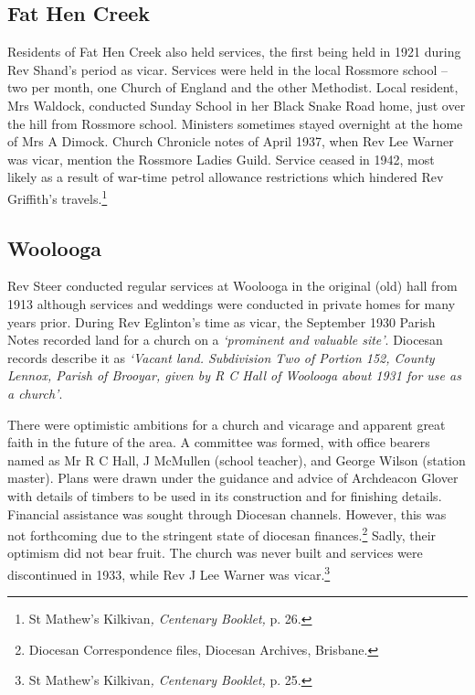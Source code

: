 \subsection{Fat Hen Creek}



Residents of Fat Hen Creek also held services, the first being held in 1921 during Rev Shand's period as vicar. Services were held in the local Rossmore school -- two per month, one Church of England and the other Methodist. Local resident, Mrs Waldock, conducted Sunday School in her Black Snake Road home, just over the hill from Rossmore school. Ministers sometimes stayed overnight at the home of Mrs A Dimock. Church Chronicle notes of April 1937, when Rev Lee Warner was vicar, mention the Rossmore Ladies Guild. Service ceased in 1942, most likely as a result of war-time petrol allowance restrictions which hindered Rev Griffith's travels.\footnote{St Mathew's Kilkivan\emph{, Centenary Booklet,} p. 26.}


\subsection{Woolooga}



Rev Steer conducted regular services at Woolooga in the original (old) hall from 1913 although services and weddings were conducted in private homes for many years prior. During Rev Eglinton's time as vicar, the September 1930 Parish Notes recorded land for a church on a \emph{`prominent and valuable site'}. Diocesan records describe it as \emph{`Vacant land. Subdivision Two of Portion 152, County Lennox, Parish of Brooyar, given by R C Hall of Woolooga about 1931 for use as a church'}.



There were optimistic ambitions for a church and vicarage and apparent great faith in the future of the area. A committee was formed, with office bearers named as Mr R C Hall, J McMullen (school teacher), and George Wilson (station master). Plans were drawn under the guidance and advice of Archdeacon Glover with details of timbers to be used in its construction and for finishing details. Financial assistance was sought through Diocesan channels. However, this was not forthcoming due to the stringent state of diocesan finances.\footnote{Diocesan Correspondence files, Diocesan Archives, Brisbane.} Sadly, their optimism did not bear fruit. The church was never built and services were discontinued in 1933, while Rev J Lee Warner was vicar.\footnote{St Mathew's Kilkivan\emph{, Centenary Booklet,} p. 25.}



